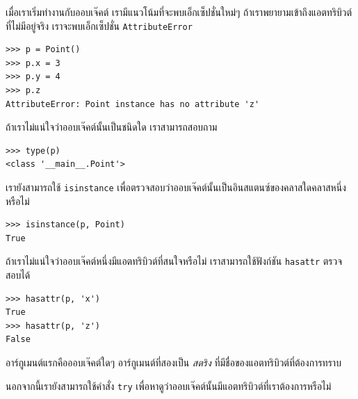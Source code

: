เมื่อเราเริ่มทำงานกับออบเจ๊คต์ เรามีแนวโน้มที่จะพบเอ็กเซ็ปชั่นใหม่ๆ ถ้าเราพยายามเข้าถึงแอตทริบิวต์ที่ไม่มีอยู่จริง เราจะพบเอ็กเซ็ปชั่น {\tt AttributeError}



\begin{verbatim}
>>> p = Point()
>>> p.x = 3
>>> p.y = 4
>>> p.z
AttributeError: Point instance has no attribute 'z'
\end{verbatim}
%

ถ้าเราไม่แน่ใจว่าออบเจ๊คต์นั้นเป็นชนิดใด เราสามารถสอบถาม

\begin{verbatim}
>>> type(p)
<class '__main__.Point'>
\end{verbatim}
%
เรายังสามารถใช้ {\tt isinstance} เพื่อตรวจสอบว่าออบเจ๊คต์นั้นเป็นอินสแตนซ์ของคลาสใดคลาสหนึ่งหรือไม่

\begin{verbatim}
>>> isinstance(p, Point)
True
\end{verbatim}
%

ถ้าเราไม่แน่ใจว่าออบเจ๊คต์หนึ่งมีแอตทริบิวต์ที่สนใจหรือไม่ เราสามารถใช้ฟังก์ชัน {\tt hasattr} ตรวจสอบได้


\begin{verbatim}
>>> hasattr(p, 'x')
True
>>> hasattr(p, 'z')
False
\end{verbatim}
%

อาร์กูเมนต์แรกคือออบเจ๊คต์ใดๆ อาร์กูเมนต์ที่สองเป็น {\em สตริง} ที่มีชื่อของแอตทริบิวต์ที่ต้องการทราบ



นอกจากนี้เรายังสามารถใช้คำสั่ง {\tt try} เพื่อหาดูว่าออบเจ๊คต์นั้นมีแอตทริบิวต์ที่เราต้องการหรือไม่

